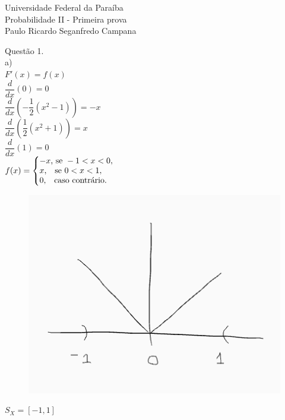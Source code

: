 \documentclass[12pt]{article}
\begin{document}
\begin{center}
	Universidade Federal da Paraíba\\
	Probabilidade II - Primeira prova\\
	Paulo Ricardo Seganfredo Campana 
\end{center}

\noindent Questão 1.\\

\noindent a)\\
	
$F'(x)=f(x)$\\

$\dfrac{d}{dx}\left(0\right)=0$\\

$\dfrac{d}{dx}\left(-\dfrac{1}{2}(x^{2}-1)\right)=-x$\\

$\dfrac{d}{dx}\left(\dfrac{1}{2}(x^{2}+1)\right)=x$\\

$\dfrac{d}{dx}(1)=0$\\

$f(x)=\left\{\begin{array}{@{}l@{}}
	-x\text{, se }-1<x<0,\\
	x\text{,\quad se }0<x<1,\\
	0\text{,\quad caso contrário.}
\end{array}\right.$\\

\begin{figure}[h!]
	\includegraphics[scale=0.7]{q1}
\end{figure}

$S_{X} = [-1,1]$\\
\end{document}
